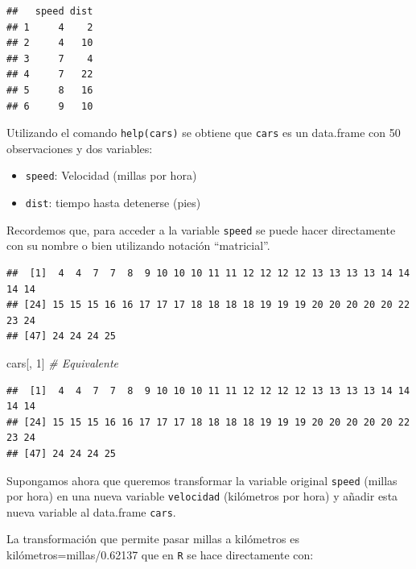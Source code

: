 \documentclass[]{book}
\newenvironment{Shaded}{\begin{snugshade}}{\end{snugshade}}
\newcommand{\DecValTok}[1]{\textcolor[rgb]{0.00,0.00,0.81}{#1}}
\newcommand{\CommentTok}[1]{\textcolor[rgb]{0.56,0.35,0.01}{\textit{#1}}}
\newcommand{\OperatorTok}[1]{\textcolor[rgb]{0.81,0.36,0.00}{\textbf{#1}}}
\newcommand{\NormalTok}[1]{#1}
\begin{document}
\begin{verbatim}
##   speed dist
## 1     4    2
## 2     4   10
## 3     7    4
## 4     7   22
## 5     8   16
## 6     9   10
\end{verbatim}

Utilizando el comando \texttt{help(cars)} se obtiene que \texttt{cars}
es un data.frame con 50 observaciones y dos variables:

\begin{itemize}
\item
  \texttt{speed}: Velocidad (millas por hora)
\item
  \texttt{dist}: tiempo hasta detenerse (pies)
\end{itemize}

Recordemos que, para acceder a la variable \texttt{speed} se puede hacer
directamente con su nombre o bien utilizando notación ``matricial''.

\begin{Shaded}
\end{Shaded}

\begin{verbatim}
##  [1]  4  4  7  7  8  9 10 10 10 11 11 12 12 12 12 13 13 13 13 14 14 14 14
## [24] 15 15 15 16 16 17 17 17 18 18 18 18 19 19 19 20 20 20 20 20 22 23 24
## [47] 24 24 24 25
\end{verbatim}

\begin{Shaded}
\begin{Highlighting}[]
\NormalTok{cars[, }\DecValTok{1}\NormalTok{]  }\CommentTok{# Equivalente}
\end{Highlighting}
\end{Shaded}

\begin{verbatim}
##  [1]  4  4  7  7  8  9 10 10 10 11 11 12 12 12 12 13 13 13 13 14 14 14 14
## [24] 15 15 15 16 16 17 17 17 18 18 18 18 19 19 19 20 20 20 20 20 22 23 24
## [47] 24 24 24 25
\end{verbatim}

Supongamos ahora que queremos transformar la variable original
\texttt{speed} (millas por hora) en una nueva variable
\texttt{velocidad} (kilómetros por hora) y añadir esta nueva variable al
data.frame \texttt{cars}.

La transformación que permite pasar millas a kilómetros es
kilómetros=millas/0.62137 que en \texttt{R} se hace directamente con:
\end{document}
